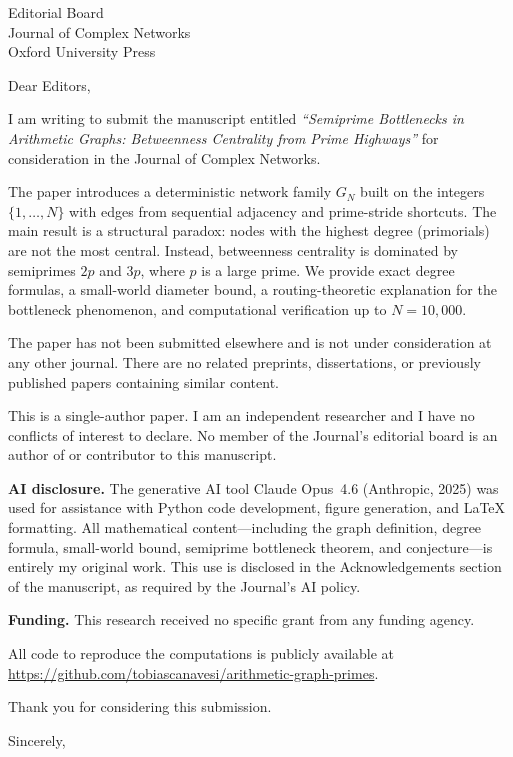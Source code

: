 \documentclass[11pt]{letter}
\date{\today}
\begin{document}
\begin{letter}{Editorial Board\\Journal of Complex Networks\\Oxford University Press}

\opening{Dear Editors,}

I am writing to submit the manuscript entitled
\emph{``Semiprime Bottlenecks in Arithmetic Graphs: Betweenness Centrality from Prime Highways''}
for consideration in the Journal of Complex Networks.

The paper introduces a deterministic network family $G_N$ built on the integers
$\{1, \ldots, N\}$ with edges from sequential adjacency and prime-stride shortcuts.
The main result is a structural paradox: nodes with the highest degree (primorials)
are not the most central. Instead, betweenness centrality is dominated by semiprimes
$2p$ and $3p$, where $p$ is a large prime. We provide exact degree formulas,
a small-world diameter bound, a routing-theoretic explanation for the bottleneck
phenomenon, and computational verification up to $N = 10{,}000$.

The paper has not been submitted elsewhere and is not under consideration at any
other journal. There are no related preprints, dissertations, or previously published
papers containing similar content.

This is a single-author paper. I am an independent researcher and I have no
conflicts of interest to declare. No member of the Journal's editorial board
is an author of or contributor to this manuscript.

\medskip
\noindent\textbf{AI disclosure.}
The generative AI tool Claude Opus~4.6 (Anthropic, 2025) was used for assistance
with Python code development, figure generation, and \LaTeX{} formatting.
All mathematical content---including the graph definition, degree formula,
small-world bound, semiprime bottleneck theorem, and conjecture---is entirely
my original work. This use is disclosed in the Acknowledgements section of the
manuscript, as required by the Journal's AI policy.

\medskip
\noindent\textbf{Funding.}
This research received no specific grant from any funding agency.

\medskip
All code to reproduce the computations is publicly available at
\url{https://github.com/tobiascanavesi/arithmetic-graph-primes}.

Thank you for considering this submission.

\closing{Sincerely,}

\end{letter}
\end{document}
